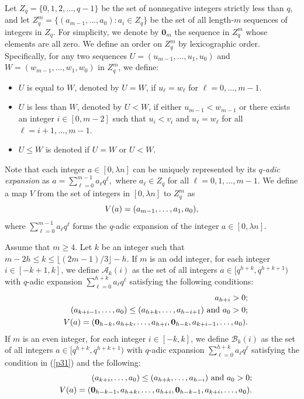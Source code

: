 \documentclass[journal,onecolumn]{IEEEtran}
\begin{document}
 Let $Z_q =\{0, 1,2,\ldots, q-1\}$ be the set of nonnegative integers strictly less than $q$, and let  
 $Z_q^{m} = \{(a_{m-1}, \ldots, a_0): a_i\in Z_q \}$  be  the set of all length-$m$
sequences of integers in  $Z_q$.   For simplicity, we  denote by $\mathbf{0}_{m}$ the sequence in $Z_q^m$ whose elements are all zero. 
We define an order on $Z_q^m$ by  lexicographic order. Specifically, for any two sequences   $U=(u_{m-1},\ldots,u_1,u_{0})$ and $W=(w_{m-1},\ldots,w_1,w_0)$ in $Z_q^m$, we define:
\begin{itemize}
\item [1.] $U$ is equal to $W$, denoted by $U=W$,  if    $u_{\ell}=w_{\ell}$ for $\ell=0,\ldots,m-1.$
\item  [2.]  $U$ is less than $W$, denoted by $U<W$, if either  $u_{m-1}<w_{m-1}  $  or there exists an integer $i\in [0,m-2]$ such that  
$u_i<v_i$ and $u_{\ell}=w_{\ell}$ for all $\ell=i+1,\ldots,m-1.$ 
\item [3.] $U\leq W$ is denoted   if $U= W$ or $U<W$.
\end{itemize}  
Note that each integer $a \in [0, \lambda n]$ can be uniquely represented by its \textit{$q$-adic expansion} as
$
a = \sum\limits_{\ell=0}^{m-1} a_{\ell} q^{\ell},
$
where $a_{\ell} \in Z_q$ for all $\ell = 0, 1, \dots, m-1$.
We define a map  $V$ from the set of  integers in $[0, \lambda n]$ to $Z_q^{m}$  as 
  \begin{equation}\notag
  V(a)=(a_{m-1}, \ldots,a_1, a_0),
\end{equation}   
where   $\sum\limits_{\ell=0}^{m-1}a_{\ell}q^{\ell}$ forms the  $q$-adic expansion of the integer  $a\in [0,\lambda n].$ 



Assume that $m\geq 4 $.  Let $k $ be an integer such that   $m-2h\leq k\leq  \lfloor {(2m-1)}/{3}\rfloor-h$. 
If $m$ is an odd integer,  
  for each integer $i\in [-k+1, k]$, we define  $\mathcal{A}_k(i)$ as  the set of  all  integers $a\in [q^{h+k},q^{h+k+1})$ with $q$-adic expansion $\sum\limits_{\ell=0}^{h+k}a_{\ell}q^{\ell}$  satisfying the following conditions:  
\begin{eqnarray}
&&a_{h+i}>0; \label{p31}\\
&&(a_{k+i-1},\ldots,a_{0})\leq (a_{h+k}, \ldots, a_{h-i+1}) \hbox{ and }a_0>0;  \label{p32} \\ 
&&V(a)=(\mathbf{0}_{h-k}, a_{h+k},\ldots,a_{h+i},\mathbf{0}_{h-k},a_{k+i-1},\ldots,a_0).  \label{p33}
\end{eqnarray}
If  $m$ is an even integer,  for each integer $i\in [-k,k]$,  we define  $\mathcal{B}_k(i)$ as the set of all integers $a\in [q^{h+k},q^{h+k+1})$  with $q$-adic expansion $\sum\limits_{\ell=0}^{h+k}a_{\ell}q^{\ell}$ satisfying the condition in (\ref{p31}) and the following:    
\begin{eqnarray}
&&(a_{k+i},\ldots,a_{0})\leq (a_{h+k}, \ldots, a_{h-i}) \hbox{ and }a_0>0;  \label{p35} \\
&&V(a)=(\mathbf{0}_{h-k-1}, a_{h+k},\ldots,a_{h+i},\mathbf{0}_{h-k-1},a_{k+i},\ldots,a_0).  \label{p36}   
\end{eqnarray}
\end{document}
